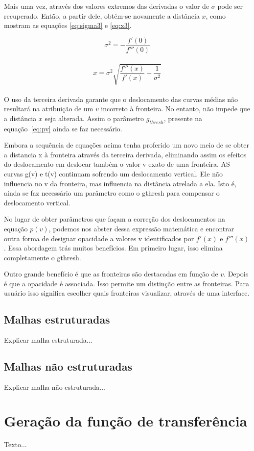 	Mais uma vez, através dos valores extremos das derivadas o valor de $ \sigma $ pode ser recuperado. Então, a partir dele, obtém-se novamente a distância $ x $, como mostram as equações \eqref{eq:sigma3} e \eqref{eq:x3}.

\begin{equation} \label{eq:sigma3}
	\sigma^{2} = -\frac{f'(0)}{f'''(0)}
\end{equation} \\

\begin{equation} \label{eq:x3}
	x = \sigma^{2}\sqrt{\frac{f'''(x)}{f'(x)} + \frac{1}{\sigma^{2}}}
\end{equation} \\

	O uso da terceira derivada garante que o deslocamento das curvas médias não resultará na atribuição de um $ v $ incorreto à fronteira. No entanto, não impede que a distância $ x $ seja alterada. Assim o parâmetro $ g_{thresh} $, presente na equação~\eqref{eq:pv} ainda se faz necessário.
	

	Embora a sequência de equações acima tenha proferido um novo meio de se obter a distancia x à fronteira através da terceira derivada, eliminando assim os efeitos do deslocamento em deslocar também o valor v exato de uma fronteira. AS curvas g(v) e t(v) continuam sofrendo um deslocamento vertical. Ele não influencia no v da fronteira, mas influencia na distância atrelada a ela. Isto é, ainda se faz necessário um parâmetro como o gthresh para compensar o deslocamento vertical.
	
	No lugar de obter parâmetros que façam a correção dos deslocamentos na equação $ p(v) $, podemos nos abster dessa expressão matemática e encontrar outra forma de designar opacidade a valores v identificados por $ f'(x) $ e $ f'''(x) $. Essa abordagem trás muitos benefícios. Em primeiro lugar, isso elimina completamente o gthresh.
	
	Outro grande benefício é que as fronteiras são destacadas em função de $ v $. Depois é que a opacidade é associada. Isso permite um distinção entre as fronteiras. Para usuário isso significa escolher quais fronteiras visualizar, através de uma interface.
	
	
    
\subsection{Malhas estruturadas}
\label{subsec:my.struct}
	Explicar malha estruturada...

\subsection{Malhas não estruturadas}
\label{subsec:my.nonstruct}
	Explicar malha não estruturada...

\section{Geração da função de transferência}
\label{sec:my.tf}
	Texto...